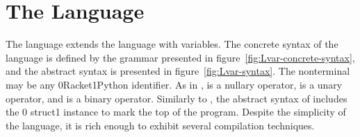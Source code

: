 \documentclass[7x10]{TimesAPriori_MIT}%
\def\racketEd{0}
\def\pythonEd{1}
\def\edition{1}
\newcommand{\racket}[1]{{\if\edition\racketEd{#1}\fi}}
\newcommand{\pythonColor}[0]{}
\newcommand{\python}[1]{{\if\edition\pythonEd\pythonColor #1\fi}}
\numberwithin{theorem}{chapter}
\numberwithin{definition}{chapter}
\numberwithin{equation}{chapter}
\begin{document}
\section{The \LangVar{} Language}
\label{sec:s0}

The \LangVar{} language extends the \LangInt{} language with
variables.  The concrete syntax of the \LangVar{} language is defined
by the grammar presented in figure~\ref{fig:Lvar-concrete-syntax}, and
the abstract syntax is presented in figure~\ref{fig:Lvar-syntax}.  The
nonterminal \Var{} may be any \racket{Racket}\python{Python}
identifier.  As in \LangInt{}, \READOP{} is a nullary operator,
\key{-} is a unary operator, and \key{+} is a binary operator.
Similarly to \LangInt{}, the abstract syntax of \LangVar{} includes the
\racket{ struct}\python{ instance} to mark
the top of the program.
Despite the simplicity of the \LangVar{} language, it is rich enough to
exhibit several compilation techniques.

\newcommand{\LvarGrammarRacket}{
  \begin{array}{rcl}
    \Exp &::=& \Var \MID \CLET{\Var}{\Exp}{\Exp}
  \end{array}
}
\newcommand{\LvarASTRacket}{
  \begin{array}{rcl}
    \Exp &::=& \VAR{\Var} \MID \LET{\Var}{\Exp}{\Exp} 
  \end{array}
}
\newcommand{\LvarGrammarPython}{
\begin{array}{rcl}
  \Exp &::=& \Var{} \\
  \Stmt &::=& \Var\mathop{\key{=}}\Exp
\end{array}
}
\newcommand{\LvarASTPython}{
  \begin{array}{rcl}
\Exp{} &::=& \VAR{\Var{}} \\
\Stmt{} &::=& \ASSIGN{\VAR{\Var}}{\Exp}
  \end{array}
}
  
\end{document}
